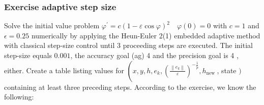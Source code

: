 \subsubsection{Exercise adaptive step size}
Solve the initial value problem $\varphi^{\prime}=c(1-\varepsilon \cos \varphi)^2 \quad \varphi(0)=0$ with $c=1$ and $\epsilon=0.25$ numerically by applying the Heun-Euler 2(1) embedded adaptive method with classical step-size control until 3 proceeding steps are executed. The initial step-size equals $0.001$, the accuracy goal (ag) 4 and the precision goal is 4 , either.\newline
Create a table listing values for $\left(x, y, h, e_k,\left(\frac{\left\|e_k\right\|}{\varepsilon}\right)^{-\frac{1}{\widetilde{p}}}, h_{\text {new }}\right.$, state $)$ containing at least three preceding steps.\newline 
According to the exercise, we know the following:
